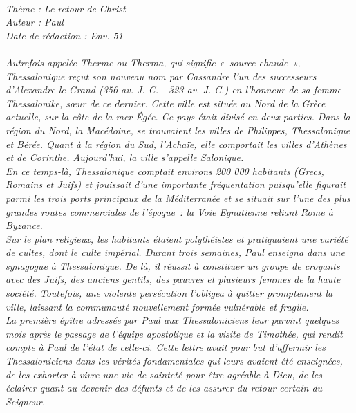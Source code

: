 \BFont
\noindent\hrulefill
{\footnotesize
\textit{
\bigskip
{\centering{}
\\Thème : Le retour de Christ
\\Auteur : Paul
\\Date de rédaction : Env. 51\\}
}
\textit{
\\Autrefois appelée Therme ou Therma, qui signifie « source chaude », Thessalonique reçut son nouveau nom par  Cassandre l’un des successeurs  d’Alexandre le Grand (356 av. J.-C. - 323 av. J.-C.) en l’honneur de sa femme Thessalonike, sœur  de ce dernier. Cette ville est située au Nord de la Grèce actuelle, sur la côte de la mer Égée. Ce pays était divisé en deux parties. Dans la région du Nord, la Macédoine, se trouvaient les villes de Philippes, Thessalonique et Bérée. Quant à la région du Sud, l’Achaïe, elle comportait les villes d’Athènes et de Corinthe. Aujourd’hui, la ville s’appelle Salonique.
\\En ce temps-là, Thessalonique comptait environs 200 000 habitants (Grecs, Romains et Juifs) et jouissait d’une importante fréquentation puisqu’elle figurait parmi les trois ports principaux de la Méditerranée et se situait sur l’une des plus grandes routes commerciales de l’époque : la Voie Egnatienne reliant Rome à Byzance.
\\Sur le plan religieux, les habitants étaient polythéistes et pratiquaient une variété de cultes, dont le culte impérial. Durant trois semaines, Paul enseigna dans une synagogue à Thessalonique. De là, il réussit à constituer un groupe de croyants avec  des Juifs,  des anciens gentils, des pauvres et plusieurs femmes de la haute société. Toutefois, une violente persécution l’obligea à quitter promptement la ville, laissant la communauté nouvellement formée vulnérable et fragile.
\\La première épître adressée par Paul aux Thessaloniciens leur parvint quelques mois après le passage de l’équipe apostolique et la visite de Timothée, qui rendit compte à Paul de l’état de celle-ci. Cette lettre avait pour but d’affermir les Thessaloniciens dans les vérités fondamentales qui leurs avaient été enseignées, de les exhorter à vivre une vie de sainteté pour être agréable à Dieu, de les éclairer quant au devenir des défunts et de les assurer du retour certain du Seigneur.\bigskip
}
}
\par\nobreak\noindent\hrulefill
